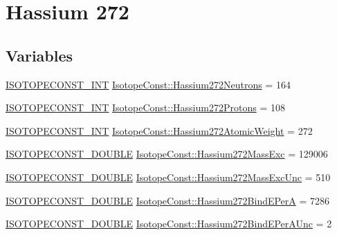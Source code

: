 \hypertarget{group___isotope_const-_hassium-_hs272}{}\section{Hassium 272}
\label{group___isotope_const-_hassium-_hs272}
\subsection*{Variables}
\begin{DoxyCompactItemize}
\item 
\mbox{\hyperlink{group___isotope_const-_macros_ga5f18360b3e99483a35c32d789e62621c}{I\+S\+O\+T\+O\+P\+E\+C\+O\+N\+S\+T\+\_\+\+I\+NT}} \mbox{\hyperlink{group___isotope_const-_hassium-_hs272_ga8606fe8477d3bea51858eef7f3416d19}{Isotope\+Const\+::\+Hassium272\+Neutrons}} = 164
\item 
\mbox{\hyperlink{group___isotope_const-_macros_ga5f18360b3e99483a35c32d789e62621c}{I\+S\+O\+T\+O\+P\+E\+C\+O\+N\+S\+T\+\_\+\+I\+NT}} \mbox{\hyperlink{group___isotope_const-_hassium-_hs272_gaa7e81494bd32bb1a8417e7d43c7e65c9}{Isotope\+Const\+::\+Hassium272\+Protons}} = 108
\item 
\mbox{\hyperlink{group___isotope_const-_macros_ga5f18360b3e99483a35c32d789e62621c}{I\+S\+O\+T\+O\+P\+E\+C\+O\+N\+S\+T\+\_\+\+I\+NT}} \mbox{\hyperlink{group___isotope_const-_hassium-_hs272_gacc94fc42ba014c5e7e7860793e7df3db}{Isotope\+Const\+::\+Hassium272\+Atomic\+Weight}} = 272
\item 
\mbox{\hyperlink{group___isotope_const-_macros_ga8f45a7272ce02c0b4c65c44636ed719a}{I\+S\+O\+T\+O\+P\+E\+C\+O\+N\+S\+T\+\_\+\+D\+O\+U\+B\+LE}} \mbox{\hyperlink{group___isotope_const-_hassium-_hs272_ga3bf3d909553a10ae36931faed7540980}{Isotope\+Const\+::\+Hassium272\+Mass\+Exc}} = 129006
\item 
\mbox{\hyperlink{group___isotope_const-_macros_ga8f45a7272ce02c0b4c65c44636ed719a}{I\+S\+O\+T\+O\+P\+E\+C\+O\+N\+S\+T\+\_\+\+D\+O\+U\+B\+LE}} \mbox{\hyperlink{group___isotope_const-_hassium-_hs272_gaa3bfcf3e2cf7bcb6c20953765385ae51}{Isotope\+Const\+::\+Hassium272\+Mass\+Exc\+Unc}} = 510
\item 
\mbox{\hyperlink{group___isotope_const-_macros_ga8f45a7272ce02c0b4c65c44636ed719a}{I\+S\+O\+T\+O\+P\+E\+C\+O\+N\+S\+T\+\_\+\+D\+O\+U\+B\+LE}} \mbox{\hyperlink{group___isotope_const-_hassium-_hs272_ga3a416e13c9cb748e0f4304dad2545750}{Isotope\+Const\+::\+Hassium272\+Bind\+E\+PerA}} = 7286
\item 
\mbox{\hyperlink{group___isotope_const-_macros_ga8f45a7272ce02c0b4c65c44636ed719a}{I\+S\+O\+T\+O\+P\+E\+C\+O\+N\+S\+T\+\_\+\+D\+O\+U\+B\+LE}} \mbox{\hyperlink{group___isotope_const-_hassium-_hs272_ga2e917fe20381e6c1e3119a6d50675326}{Isotope\+Const\+::\+Hassium272\+Bind\+E\+Per\+A\+Unc}} = 2

\end{DoxyCompactItemize}
